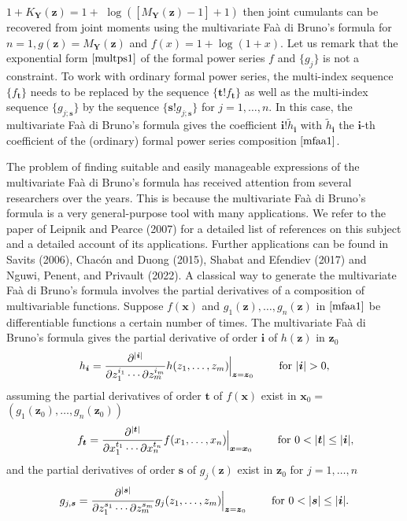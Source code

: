 \(1 + K_{\boldsymbol{Y}}(\boldsymbol{z})=1 +\)
\(\log([M_{\boldsymbol{Y}}(\boldsymbol{z})-1]+1)\) then joint cumulants can be recovered from joint moments using the multivariate Faà di Bruno's formula for \(n=1, g(\boldsymbol{z}) = M_{\boldsymbol{Y}}(\boldsymbol{z})\) and \(f(x)= 1 + \log (1 + x).\) Let us remark that the exponential form \(\eqref{multps1}\) of the formal power series \(f\) and \(\{g_j\}\) is not a constraint. To work with ordinary formal power series, the multi-index sequence \(\{f_{\boldsymbol{t}}\}\) needs to be replaced by the sequence \(\{\boldsymbol{t}! f_{\boldsymbol{t}}\}\) as well as the multi-index sequence \(\{g_{j; \boldsymbol{s}}\}\) by the sequence \(\{\boldsymbol{s}! g_{j; \boldsymbol{s}}\}\) for \(j=1, \ldots,n.\) In this case, the multivariate Faà di Bruno's formula gives the coefficient \({\boldsymbol{i}!} \tilde{h}_{\boldsymbol{i}}\) with \(\tilde{h}_{\boldsymbol{i}}\) the \({\boldsymbol{i}}\)-th coefficient of the (ordinary) formal power series composition \(\eqref{mfaa1}\).

The problem of finding suitable and easily manageable expressions of the multivariate Faà di Bruno's formula has received attention from several researchers over the years. This is because the multivariate Faà di Bruno's formula is a very general-purpose tool with many applications. We refer to the paper of Leipnik and Pearce (2007) for a detailed list of references on this subject and a detailed account of its applications. Further applications can be found in Savits (2006), Chacón and Duong (2015), Shabat and Efendiev (2017) and Nguwi, Penent, and Privault (2022). A classical way to generate the multivariate Faà di Bruno's formula involves the partial derivatives of a composition of multivariable functions. Suppose \(f(\boldsymbol{x})\) and \(g_1(\boldsymbol{z}), \ldots, g_n(\boldsymbol{z})\) in \(\eqref{mfaa1}\) be differentiable functions a certain number of times. The multivariate Faà di Bruno's formula gives the partial derivative of order \(\boldsymbol{i}\) of \(h(\boldsymbol{z})\) in \(\boldsymbol{z}_0\)
\begin{equation}\label{(hi)}
h_{\boldsymbol{i}} = \frac{\partial^{|\boldsymbol{i}|}}{\partial z_1^{i_1} \cdots
\partial z_m^{i_m}} h(z_1, \ldots, z_m) \!\!\Bigm\lvert_{\boldsymbol{z}=\boldsymbol{z}_0} \qquad \hbox{for $|\boldsymbol{i}|>0,$}
\end{equation}
assuming the partial derivatives of order
\(\boldsymbol{t}\) of \(f(\boldsymbol{x})\) exist in \(\boldsymbol{x}_0=\) \(\left(g_1(\boldsymbol{z}_0), \ldots,g_n(\boldsymbol{z}_0)\right)\)
\[ \qquad f_{\boldsymbol{t}} = \frac{\partial^{|\boldsymbol{t}|}}{\partial x_1^{t_1} \cdots
\partial x_n^{t_n}} f(x_1, \ldots, x_n) \!\!\Bigm\lvert_{\boldsymbol{x}=\boldsymbol{x}_0}  \qquad \hbox{for $0 < |\boldsymbol{t}| \leq |\boldsymbol{i}|,$}\]
and the partial derivatives of order \(\boldsymbol{s}\) of \(g_j(\boldsymbol{z})\) exist in \(\boldsymbol{z}_0\) for \(j=1,\ldots,n\)
\[g_{j,\boldsymbol{s}} = 
\frac{\partial^{|\boldsymbol{s}|}}{\partial z_1^{s_1} \cdots
\partial z_m^{s_m}} g_j(z_1, \ldots, z_m) \!\!\Bigm\lvert_{\boldsymbol{z}=\boldsymbol{z}_0} \qquad \hbox{for $0 < |\boldsymbol{s}| \leq |\boldsymbol{i}|$}.\]

